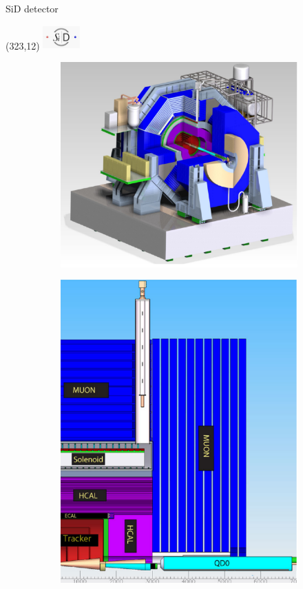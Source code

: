 \documentclass[xcolor={dvipsnames}]{beamer}
\newcommand{\sidlogo}{
  \setlength{\TPHorizModule}{1pt}
  \setlength{\TPVertModule}{1pt}
  \begin{textblock}{1}(323,12)
   \includegraphics[width=40pt,height=26pt]{figures/SiD.jpeg}
  \end{textblock}
  }
\begin{document}
\begin{frame}{SiD detector}
\sidlogo
\begin{figure}[T]
\centering
\begin{subfigure}[b]{0.49\textwidth}
\centering
\includegraphics[height=0.65\textheight]{figures/SiD_detector_model.pdf}
\end{subfigure}
\begin{subfigure}[b]{0.49\textwidth}
\centering
\includegraphics[height=0.65\textheight]{figures/SiD_detector_model_Ausschnitt.pdf}

\end{subfigure}
\end{figure}
\end{frame}
\end{document}
